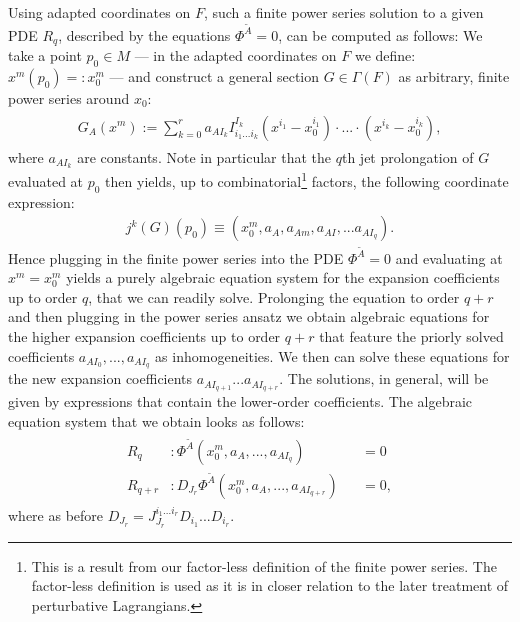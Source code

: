 Using adapted coordinates on $F$, such a finite power series solution to a given PDE $R_q$, described by the equations $\Phi^{\tilde{A}} = 0$, can be computed as follows: We take a point $p_0 \in M$ --- in the adapted coordinates on $F$ we define: $x^m(p_0) =: x_0^m$ --- and construct a general section $G\in\Gamma(F)$ as arbitrary, finite power series around $x_0$:
\begin{align}
\begin{aligned}
    G_A(x^m) :=  \sum_{k=0}^{r} a_{AI_k}I^{I_k}_{i_1...i_k}(x^{i_1}-x_0^{i_1}) \cdot ... \cdot (x^{i_k}- x_0^{i_k}), 
\end{aligned}
\end{align}
where $a_{AI_k}$ are constants. Note in particular that the $q$th jet prolongation of $G$ evaluated at $p_0$ then yields, up to combinatorial\footnote{This is a result from our factor-less definition of the finite power series. The factor-less definition is used as it is in closer relation to the later treatment of perturbative Lagrangians.} factors, the following coordinate expression:
\begin{align}
    j^k(G)(p_0) \equiv \left ( x_0^m, a_A, a_{Am}, a_{AI}, ... a_{AI_q} \right ).
\end{align}
Hence plugging in the finite power series into the PDE $\Phi^{\tilde{A}} =0$ and evaluating at $x^m=x^m_0$ yields a purely algebraic equation system for the expansion coefficients up to order $q$, that we can readily solve. Prolonging the equation to order $q+r$ and then plugging in the power series ansatz we obtain algebraic equations for the higher expansion coefficients up to order $q+r$ that feature the priorly solved coefficients $a_{AI_0},...,a_{AI_q}$ as inhomogeneities. We then can solve these equations for the new expansion coefficients $a_{AI_{q+1}}...a_{AI_{q+r}}$. The solutions, in general, will be given by expressions that contain the lower-order coefficients.
The algebraic equation system that we obtain looks as follows:
\begin{align}
\begin{aligned}
R_q &: \Phi^{\tilde{A}}(x_0^m,a_A,...,a_{AI_q}) &&= 0 \\
R_{q+r} &:  D_{J_r}\Phi^{\tilde{A}}(x_0^m,a_A,...,a_{AI_{q+r}}) &&= 0,
\end{aligned}
\end{align}
where as before $D_{J_r} = J^{i_1...i_r}_{J_r} D_{i_1} ... D_{i_r}$.

